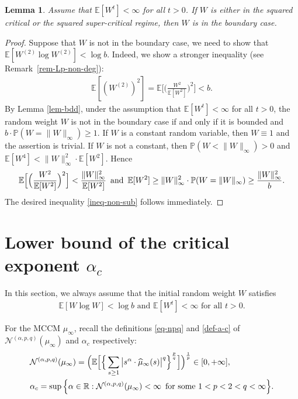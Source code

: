 \documentclass[12pt]{amsart}
\newtheorem{lemma}[theorem]{Lemma}
\theoremstyle{definition}
\theoremstyle{remark}
\newcommand{\R}{\mathbb{R}}
\newcommand{\E}{\mathbb{E}}
\newcommand{\PP}{\mathbb{P}}
\newcommand{\an}{\text{\, and \,}}
\numberwithin{equation}{section}
\begin{document}
\begin{lemma}\label{lem-non-sub}
Assume that $\E[W^t]<\infty$ for all $t>0$. If $W$ is either  in the squared critical or the squared super-critical regime, then $W$ is in the boundary case.
\end{lemma}

\begin{proof}
 Suppose that $W$ is not in the boundary case,  we  need to show that $\E[  W^{(2)} \log W^{(2)}] <\log b$. Indeed, we show a stronger inequality  (see  Remark~\ref{rem-Lp-non-deg}): 
\begin{align}\label{ineq-non-sub}
\E[(W^{(2)})^2] = \E\Big[ \Big(\frac{W^2}{\E[W^2]}\Big)^2\Big]<b.
\end{align}
By Lemma \ref{lem-bdd},  under the assumption that  $\E[W^t]<\infty$ for all $t>0$,  the random weight $W$ is not in the boundary case if and only if it is bounded and 
$
b \cdot \PP(W= \|W\|_\infty) \ge 1.
$
If $W$ is a constant random variable, then  $W \equiv 1$ and the assertion is trivial. If $W$ is not a constant, then $\PP(W<\|W\|_\infty)>0$ and 
$
\E[W^4] < \|W\|_\infty^2  \cdot \E[W^2]$. Hence 
\[
\E\Big[ \Big(\frac{W^2}{\E[W^2]}\Big)^2\Big] < \frac{\|W\|_\infty^2}{\E[W^2]} \an 
\E[W^2]  \ge  \|W\|_\infty^2\cdot \PP(W=\|W\|_\infty) \ge  \frac{\|W\|_\infty^2}{b}.
\]
The desired inequality \eqref{ineq-non-sub} follows immediately. 
\end{proof}















\section{Lower bound of the critical exponent $\alpha_c$}\label{sec-squared}

In this section, we always assume that the initial random weight $W$ satisfies
\begin{align}\label{all-m}
\text{$\E[W\log W]<\log b$ and $\E[W^t]<\infty$ for all $t>0$.}
\end{align}


For the MCCM $\mu_\infty$, recall the definitions \eqref{eq-npq} and \eqref{def-a-c} of $\mathcal{N}^{(\alpha, p, q)}(\mu_\infty)$ and $\alpha_c$ respectively:
\begin{align*}
	& \mathcal{N}^{(\alpha, p, q)}(\mu_\infty) =   \Big(\E\Big[  \Big\{ \sum_{s\ge 1}    \big| s^{\alpha} \cdot \widehat{\mu}_\infty(s)\big|^q  \Big\}^{\frac{p}{q}}\Big] \Big)^{\frac{1}{p}}  \in [0, +\infty],
\\
& \alpha_c =  \sup \Big\{\alpha \in \R:  \mathcal{N}^{(\alpha, p, q)}(\mu_\infty) <\infty \text{\, for some $1<p<2<q<\infty$} \Big\}.
\end{align*}
\end{document}
